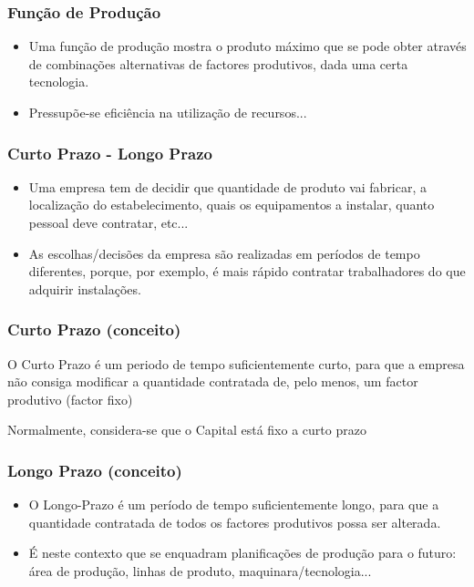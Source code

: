 \begin{frame}
	\frametitle{Fun\c c\~ao de Produ\c c\~ao}
	\begin{itemize}
		\item Uma fun\c c\~ao de produ\c c\~ao mostra o produto m\'aximo que se pode obter atrav\'es de combina\c c\~oes alternativas de factores produtivos, dada uma certa tecnologia.
		\item Pressup\~oe-se efici\^encia na utiliza\c c\~ao de recursos...
	\end{itemize}
\end{frame}

\begin{frame}
	\frametitle{Curto Prazo - Longo Prazo}
	\begin{itemize}
		\item Uma empresa tem de decidir que quantidade de produto vai fabricar, a localiza\c c\~ao do estabelecimento, quais os equipamentos a instalar, quanto pessoal deve contratar, etc...\pause
		\item As escolhas/decis\~oes da empresa s\~ao realizadas em per\'iodos de tempo diferentes, porque, por exemplo, \'e mais r\'apido contratar trabalhadores do que adquirir instala\c c\~oes.
	\end{itemize}
\end{frame}

\begin{frame}
	\frametitle{Curto Prazo (conceito)}
	O Curto Prazo \'e um periodo de tempo suficientemente curto, para que a empresa n\~ao consiga modificar a quantidade contratada de, pelo menos, um factor produtivo (factor fixo)
	
	\vspace{0.2cm}

	Normalmente, considera-se que o Capital est\'a fixo a curto prazo
\end{frame}

\begin{frame}
	\frametitle{Longo Prazo (conceito)}
	\begin{itemize}
		\item O Longo-Prazo \'e um per\'iodo de tempo suficientemente longo, para que a quantidade contratada de todos os factores produtivos possa ser alterada.
		\item \'E neste contexto que se enquadram planifica\c c\~oes de produ\c c\~ao para o futuro: \'area de produ\c c\~ao, linhas de produto, maquinara/tecnologia...
	\end{itemize}
\end{frame}

